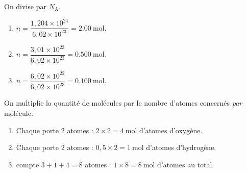 \documentclass[11pt,a4paper]{article}
\begin{document}
\begin{corrige}
On divise par $N_{\mathrm{A}}$.
\begin{enumerate}[label=\alph*)]
  \item $n = \dfrac{1{,}204\times10^{24}}{6{,}02\times10^{23}} = \SI{2.00}{\mole}$.
  \item $n = \dfrac{3{,}01\times10^{23}}{6{,}02\times10^{23}} = \SI{0.500}{\mole}$.
  \item $n = \dfrac{6{,}02\times10^{22}}{6{,}02\times10^{23}} = \SI{0.100}{\mole}$.
\end{enumerate}
\end{corrige}

\begin{corrige}
On multiplie la quantité de molécules par le nombre d'atomes concernés \emph{par} molécule.
\begin{enumerate}[label=\alph*)]
  \item Chaque  porte $2$ atomes  : $2\times 2 = \SI{4}{\mole}$ d'atomes d'oxygène.
  \item Chaque  porte $2$ atomes  : $0{,}5\times 2 = \SI{1}{\mole}$ d'atomes d'hydrogène.
  \item {} compte $3+1+4 = 8$ atomes : $1\times 8 = \SI{8}{\mole}$ d'atomes au total.
\end{enumerate}
\end{corrige}
\end{document}
